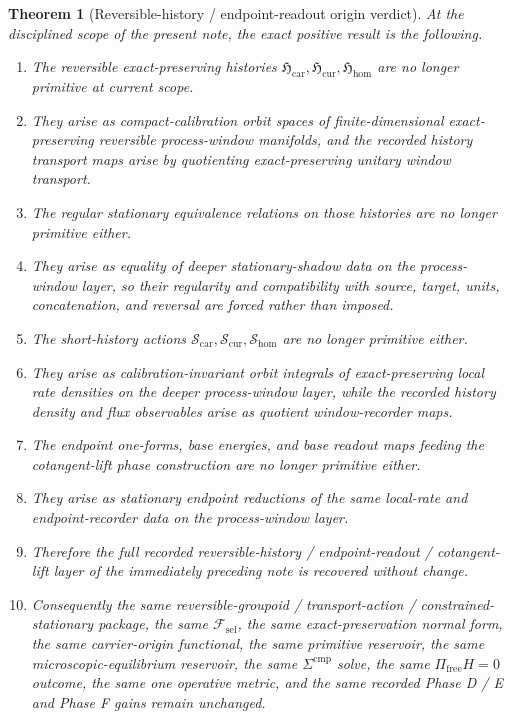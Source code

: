 \documentclass[11pt]{article}
\newcommand{\StemFunctional}{\mathscr F_{\mathrm{sel}}}
\newcommand{\TensorHistoryClass}{\mathfrak H_{\mathrm{car}}}
\newcommand{\CurHistoryClass}{\mathfrak H_{\mathrm{cur}}}
\newcommand{\HomHistoryClass}{\mathfrak H_{\mathrm{hom}}}
\newcommand{\TensorHistoryAction}{\mathscr S_{\mathrm{car}}}
\newcommand{\CurHistoryAction}{\mathscr S_{\mathrm{cur}}}
\newcommand{\HomHistoryAction}{\mathscr S_{\mathrm{hom}}}
\newtheorem{theorem}{Theorem}
\begin{document}
\begin{theorem}[Reversible-history / endpoint-readout origin verdict]
\label{thm:verdict}
At the disciplined scope of the present note, the exact positive result is the following.
\begin{enumerate}
    \item The reversible exact-preserving histories \(\TensorHistoryClass,\CurHistoryClass,\HomHistoryClass\) are no longer primitive at current scope.
    \item They arise as compact-calibration orbit spaces of finite-dimensional exact-preserving reversible process-window manifolds, and the recorded history transport maps arise by quotienting exact-preserving unitary window transport.
    \item The regular stationary equivalence relations on those histories are no longer primitive either.
    \item They arise as equality of deeper stationary-shadow data on the process-window layer, so their regularity and compatibility with source, target, units, concatenation, and reversal are forced rather than imposed.
    \item The short-history actions \(\TensorHistoryAction,\CurHistoryAction,\HomHistoryAction\) are no longer primitive either.
    \item They arise as calibration-invariant orbit integrals of exact-preserving local rate densities on the deeper process-window layer, while the recorded history density and flux observables arise as quotient window-recorder maps.
    \item The endpoint one-forms, base energies, and base readout maps feeding the cotangent-lift phase construction are no longer primitive either.
    \item They arise as stationary endpoint reductions of the same local-rate and endpoint-recorder data on the process-window layer.
    \item Therefore the full recorded reversible-history / endpoint-readout / cotangent-lift layer of the immediately preceding note is recovered without change.
    \item Consequently the same reversible-groupoid / transport-action / constrained-stationary package, the same \(\StemFunctional\), the same exact-preservation normal form, the same carrier-origin functional, the same primitive reservoir, the same microscopic-equilibrium reservoir, the same \(\Sigma^{\mathrm{cmp}}\) solve, the same \(\Pi_{\mathrm{free}}H=0\) outcome, the same one operative metric, and the same recorded Phase D / E and Phase F gains remain unchanged.

\end{enumerate}
\end{theorem}
\end{document}
